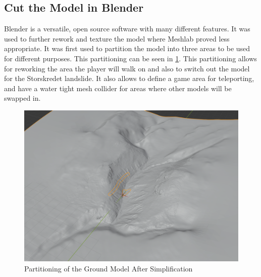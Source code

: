     \subsection{Cut the Model in Blender}
        Blender\cite{blender} is a versatile, open source software with many different features. It was used to further rework and texture the model where Meshlab proved less appropriate. It was first used to partition the model into three areas to be used for different purposes. This partitioning can be seen in \cref{fig:model_original}.
        This partitioning allows for reworking the area the player will walk on and also to switch out the model for the Storskredet landslide. It also allows to define a game area for teleporting, and have a water tight mesh collider for areas where other models will be swapped in.
        
        \FloatBarrier
        \begin{figure}[htbp]
            \centering
            \includegraphics[width=\ImageWidth]{figures/ground_simplified_cut.PNG}
            \caption{Partitioning of the Ground Model After Simplification}
            \label{fig:model_original}
        \end{figure}
        \FloatBarrier
    
